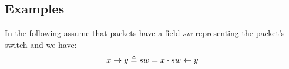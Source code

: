 \subsection{Examples}

In the following assume that packets have a field $sw$
representing the packet's switch and we have:
\begin{equation*}
    x \rightarrow y \triangleq sw = x \cdot sw \leftarrow y
\end{equation*}





